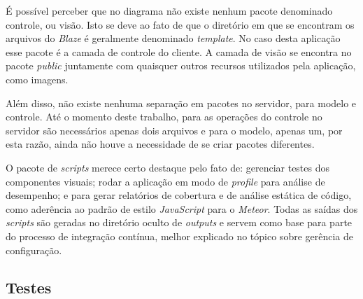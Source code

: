 É possível perceber que no diagrama não existe nenhum pacote denominado controle, ou visão. Isto se deve ao fato de que o diretório em que se encontram os arquivos do \textit{Blaze} é geralmente denominado \textit{template}. No caso desta aplicação esse pacote é a camada de controle do cliente. A camada de visão se encontra no pacote \textit{public} juntamente com quaisquer outros recursos utilizados pela aplicação, como imagens.

Além disso, não existe nenhuma separação em pacotes no servidor, para modelo e controle. Até o momento deste trabalho, para as operações do controle no servidor são necessários apenas dois arquivos e para o modelo, apenas um, por esta razão, ainda não houve a necessidade de se criar pacotes diferentes.

O pacote de \textit{scripts} merece certo destaque pelo fato de: gerenciar testes dos componentes visuais; rodar a aplicação em modo de \textit{profile} para análise de desempenho; e para gerar relatórios de cobertura e de análise estática de código, como aderência ao padrão de estilo \textit{JavaScript} para o \textit{Meteor}. Todas as saídas dos \textit{scripts} são geradas no diretório oculto de \textit{outputs} e servem como base para parte do processo de integração contínua, melhor explicado no tópico sobre gerência de configuração.


\subsection{Testes}

